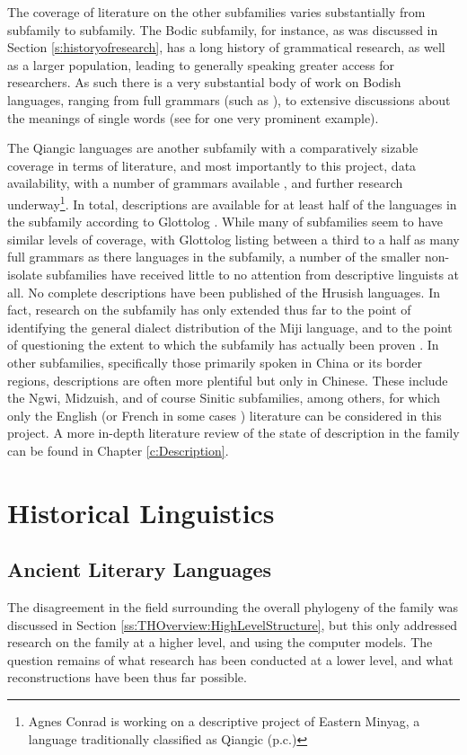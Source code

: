 {The coverage of literature on the other subfamilies varies substantially from subfamily to subfamily. The Bodic subfamily, for instance, as was discussed in Section \ref{s:historyofresearch}, has a long history of grammatical research, as well as a larger population, leading to generally speaking greater access for researchers. As such there is a very substantial body of work on Bodish languages, ranging from full grammars (such as ), to extensive discussions about the meanings of single words (see  for one very prominent example).

The Qiangic languages are another subfamily with a comparatively sizable coverage in terms of literature, and most importantly to this project, data availability, with a number of grammars available \cites{LaPolla2003}{Ding2014}, and further research underway\footnote{Agnes Conrad is working on a descriptive project of Eastern Minyag, a language traditionally classified as Qiangic (p.c.)}. In total, descriptions are available for at least half of the languages in the subfamily according to Glottolog \cite{glottolog}. While many of subfamilies seem to have similar levels of coverage, with Glottolog listing between a third to a half as many full grammars as there languages in the subfamily, a number of the smaller non-isolate subfamilies have received little to no attention from descriptive linguists at all. No complete descriptions have been published of the Hrusish languages. In fact, research on the subfamily has only extended thus far to the point of identifying the general dialect distribution of the Miji language, and to the point of questioning the extent to which the subfamily has actually been proven \cite{Post2017}. In other subfamilies, specifically those primarily spoken in China or its border regions, descriptions are often more plentiful but only in Chinese. These include the Ngwi, Midzuish, and of course Sinitic subfamilies, among others, for which only the English (or French in some cases \cite{Lai2017}) literature can be considered in this project. A more in-depth literature review of the state of description in the family can be found in Chapter \ref{c:Description}.
\section{Historical Linguistics}
\subsection{Ancient Literary Languages}\label{s:AncientLiteraryLanguages}
The disagreement in the field surrounding the overall phylogeny of the family was discussed in Section \ref{ss:THOverview:HighLevelStructure}, but this only addressed research on the family at a higher level, and using the computer models. The question remains of what research has been conducted at a lower level, and what reconstructions have been thus far possible.

}
